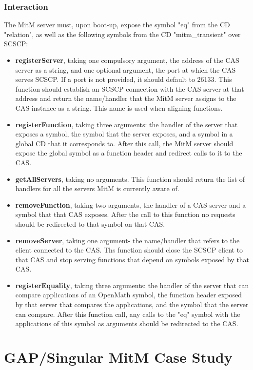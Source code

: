 \subsubsection{Interaction}
The MitM server must, upon boot-up, expose the symbol "eq" from the CD 
"relation", as well as the following symbols from the CD "mitm\_transient"
over SCSCP:
\begin{itemize}
  \item \textbf{registerServer}, taking one compulsory argument, the address of the
    CAS server as a string, and one optional argument, the port at which the CAS
    serves SCSCP. If a port is not provided, it should default to 26133. This
    function should establish an SCSCP connection with the CAS server at that 
    address and return the name/handler that the MitM server assigns to the 
    CAS instance as a string. This name is used when aligning functions.
  \item \textbf{registerFunction}, taking three arguments: the handler of the 
    server that exposes a symbol, the symbol that the server exposes, and
    a symbol in a global CD that it corresponds to. After this call, the MitM
    server should expose the global symbol as a function header and redirect
    calls to it to the CAS.
  \item \textbf{getAllServers}, taking no arguments. This function should return 
    the list of handlers for all the servers MitM is currently aware of.
  \item \textbf{removeFunction}, taking two arguments, the handler of a CAS server 
    and a symbol that that CAS exposes. After the call to this function no 
    requests should be redirected to that symbol on that CAS.
  \item \textbf{removeServer}, taking one argument- the name/handler that refers
    to the client connected to the CAS. Ths function should close the SCSCP client
    to that CAS and stop serving functions that depend on symbols exposed by
    that CAS.
  \item \textbf{registerEquality}, taking three arguments: the handler of the 
    server that can compare applications of an OpenMath symbol, the function
    header exposed by that server that compares the applications, and the symbol
    that the server can compare. After this function call, any calls to the "eq"
    symbol with the applications of this symbol as arguments should be redirected
    to the CAS.
\end{itemize}

\section{GAP/Singular MitM Case Study}

